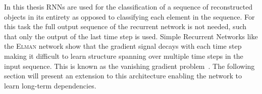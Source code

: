 In this thesis RNNs are used for the classification of a sequence of
reconstructed objects in its entirety as opposed to classifying each element in
the sequence. For this task the full output sequence of the recurrent network is
not needed, such that only the output of the last time step is used. Simple
Recurrent Networks like the \textsc{Elman} network show that the gradient signal
decays with each time step making it difficult to learn structure spanning over
multiple time steps in the input sequence. This is known as the vanishing
gradient problem~\cite{hochreiter, lecun_bengio_hinton_DL}. The following
section will present an extension to this architecture enabling the network to
learn long-term dependencies.

